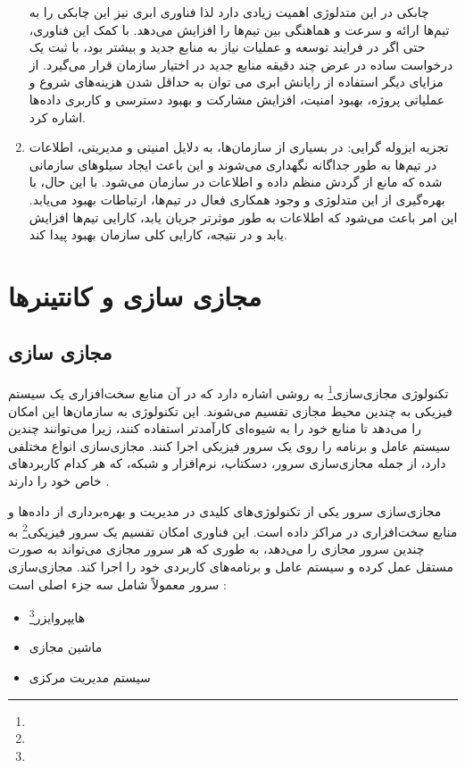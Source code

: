 \begin{enumerate}
چابکی در این متدلوژی اهمیت زیادی دارد لذا فناوری ابری نیز این چابکی را به تیم‌ها ارائه و سرعت و هماهنگی بین تیم‌ها را افزایش می‌دهد. با کمک این فناوری، حتی اگر در فرایند توسعه و عملیات نیاز به منابع جدید و بیشتر بود، با ثبت یک درخواست ساده در عرض چند دقیقه منابع جدید در اختیار سازمان قرار می‌گیرد. از مزایای دیگر استفاده از رایانش ابری می توان به حداقل شدن هزینه‌های شروع و عملیاتی پروژه، بهبود امنیت، افزایش مشارکت و بهبود دسترسی و کاربری داده‌ها اشاره کرد.
	\item
تجزیه ایزوله گرایی: در بسیاری از سازمان‌ها، به دلایل امنیتی و مدیریتی، اطلاعات در تیم‌ها به طور جداگانه نگهداری می‌شوند و این باعث ایجاد سیلوهای سازمانی شده که مانع از گردش منظم داده و اطلاعات در سازمان می‌شود.
با این حال، با بهره‌گیری از این متدلوژی و وجود همکاری فعال در تیم‌ها، ارتباطات بهبود می‌یابد. این امر باعث می‌شود که اطلاعات به طور موثرتر جریان یابد، کارایی تیم‌ها افزایش یابد و در نتیجه، کارایی کلی سازمان بهبود پیدا کند.
\end{enumerate}

\section{مجازی سازی و کانتینرها}
\subsection{مجازی سازی}
تکنولوژی مجازی‌سازی\footnote{} به روشی اشاره دارد که در آن منابع سخت‌افزاری یک سیستم فیزیکی به چندین محیط مجازی تقسیم می‌شوند. این تکنولوژی به سازمان‌ها این امکان را می‌دهد تا منابع خود را به شیوه‌ای کارآمدتر استفاده کنند، زیرا می‌توانند چندین سیستم عامل و برنامه را روی یک سرور فیزیکی اجرا کنند. مجازی‌سازی انواع مختلفی دارد، از جمله مجازی‌سازی سرور، دسکتاپ، نرم‌افزار و شبکه، که هر کدام کاربردهای خاص خود را دارند \cite{virtualization1, virtualization2}.

مجازی‌سازی سرور یکی از تکنولوژی‌های کلیدی در مدیریت و بهره‌برداری از داده‌ها و منابع سخت‌افزاری در مراکز داده است. این فناوری امکان تقسیم یک سرور فیزیکی\footnote{} به چندین سرور مجازی را می‌دهد، به طوری که هر سرور مجازی می‌تواند به صورت مستقل عمل کرده و سیستم عامل و برنامه‌های کاربردی خود را اجرا کند. مجازی‌سازی سرور معمولاً شامل سه جزء اصلی است \cite{virtualization1}:
\begin{itemize}
	\item 
هایپروایزر\footnote{}
	\item
ماشین مجازی
	\item 
سیستم مدیریت مرکزی
\end{itemize}

